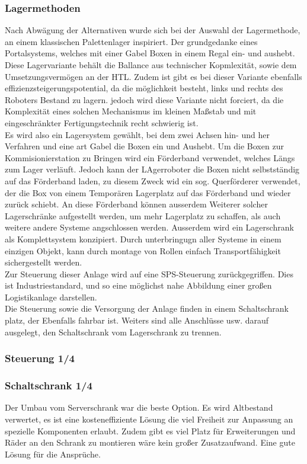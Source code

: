 \subsubsection{Lagermethoden }
Nach Abwägung der Alternativen wurde sich bei der Auswahl der Lagermethode, an einem klassischen Palettenlager inspiriert. Der grundgedanke eines Portalsystems, welches mit einer Gabel Boxen in einem Regal ein- und aushebt. Diese Lagervariante behält die Ballance aus technischer Kopmlexität, sowie dem Umsetzungsvermögen an der HTL. Zudem ist gibt es bei dieser Variante ebenfalls effizienzsteigerungspotential, da die möglichkeit besteht, links und rechts des Roboters Bestand zu lagern. jedoch wird diese Variante nicht forciert, da die Komplexität eines solchen Mechanismus im kleinen Maßstab und mit eingeschränkter Fertigungstechnik recht schwierig ist.\\ Es wird also ein Lagersystem gewählt, bei dem zwei Achsen hin- und her Verfahren und eine art Gabel die Boxen ein und Aushebt. Um die Boxen zur Kommisionierstation zu Bringen wird ein Förderband verwendet, welches Längs zum Lager verläuft. Jedoch kann der LAgerroboter die Boxen nicht selbstständig auf das Förderband laden, zu diesem Zweck wid ein sog. Querförderer verwendet, der die Box von einem Temporären Lagerplatz auf das Förderband und wieder zurück schiebt. An diese Förderband können ausserdem Weiterer solcher Lagerschränke aufgestellt werden, um mehr Lagerplatz zu schaffen, als auch weitere andere Systeme angschlossen werden. Ausserdem wird ein Lagerschrank als Komplettsystem konzipiert. Durch unterbringugn aller Systeme in einem einzigen Objekt, kann durch montage von Rollen einfach Transportfähigkeit sichergestellt werden.\\
Zur Steuerung dieser Anlage wird auf eine SPS-Steuerung zurückgegriffen. Dies ist Industriestandard, und so eine möglichst nahe Abbildung einer großen Logistikanlage darstellen. \\
Die Steuerung sowie die Versorgung der Anlage finden in einem Schaltschrank platz, der Ebenfalls fahrbar ist. Weiters sind alle Anschlüsse usw. darauf ausgelegt, den Schaltschrank vom Lagerschrank zu trennen. 

\subsubsection{Steuerung 1/4}


\subsubsection{Schaltschrank 1/4}
Der Umbau vom Serverschrank war die beste Option. Es wird Altbestand verwertet, es ist eine kosteneffiziente Lösung die viel Freiheit zur Anpassung an spezielle Komponenten erlaubt. Zudem gibt es viel Platz für Erweiterungen und Räder an den Schrank zu montieren wäre kein großer Zusatzaufwand. 
Eine gute Lösung für die Ansprüche.

